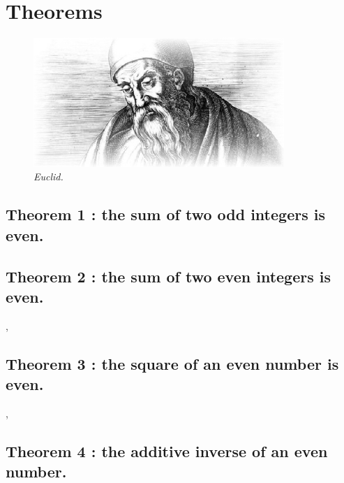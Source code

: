 \documentclass[preview]{standalone}
\begin{document}
\section{Theorems}
\begin{figure}[h!]
    \centering
    \includegraphics[width=9.5cm]{../resources/jpg/1.6.introduction.to.proofs/euclid.jpg}
    \caption*{\emph{Euclid.}}
\end{figure} 

\subsection[The sum of two odd integers is even.]{\color{section} Theorem 1 \color{black} : the sum of two odd integers is even.}

\pagebreak


\subsection[The sum of two even integers is even.]{\color{section} Theorem 2 \color{black} : the sum of two even integers is even.}

\sep


\subsection[The square of an even number is even.]{\color{section} Theorem 3 \color{black} : the square of an even number is even.}

\sep


\subsection[The additive inverse of an even number.]{\color{section} Theorem 4 \color{black} : the additive inverse of an even number.}
 
\pagebreak
\end{document}
